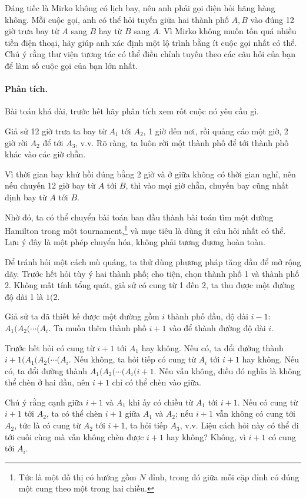 \documentclass[11pt]{article}
\begin{document}
Đáng tiếc là Mirko không có lịch bay, nên anh phải gọi điện hỏi hãng hàng
không. Mỗi cuộc gọi, anh có thể hỏi tuyến giữa hai thành phố $A,B$ vào đúng
12 giờ trưa bay từ $A$ sang $B$ hay từ $B$ sang $A$. Vì Mirko không muốn tốn
quá nhiều tiền điện thoại, hãy giúp anh xác định một lộ trình bằng ít cuộc gọi
nhất có thể. Chú ý rằng thư viện tương tác có thể điều chỉnh tuyến theo các
câu hỏi của bạn để làm số cuộc gọi của bạn lớn nhất.

\paragraph{Phân tích.}
Bài toán khá dài, trước hết hãy phân tích xem rốt cuộc nó yêu cầu gì.

Giả sử 12 giờ trưa ta bay từ $A_1$ tới $A_2$, 1 giờ đến nơi, rồi quảng cáo một
giờ, 2 giờ rời $A_2$ để tới $A_3$, v.v. Rõ ràng, ta luôn rời một thành phố để
tới thành phố khác vào các giờ chẵn.

Vì thời gian bay khứ hồi đúng bằng 2 giờ và ở giữa không có thời gian nghỉ,
nên nếu chuyến 12 giờ bay từ $A$ tới $B$, thì vào mọi giờ chẵn, chuyến bay
cũng nhất định bay từ $A$ tới $B$.

Nhờ đó, ta có thể chuyển bài toán ban đầu thành bài toán tìm một đường
Hamilton trong một tournament,\footnote{Tức là một đồ thị có hướng gồm $N$
đỉnh, trong đó giữa mỗi cặp đỉnh có đúng một cung theo một trong hai chiều.}
và mục tiêu là dùng ít câu hỏi nhất có thể. Lưu ý đây là một phép chuyển hóa,
không phải tương đương hoàn toàn.

Để tránh hỏi một cách mù quáng, ta thử dùng phương pháp tăng dần để mở rộng
dãy. Trước hết hỏi tùy ý hai thành phố; cho tiện, chọn thành phố 1 và thành
phố 2. Không mất tính tổng quát, giả sử có cung từ 1 đến 2, ta thu được một
đường độ dài 1 là $1(2$.

Giả sử ta đã thiết kế được một đường gồm $i$ thành phố đầu, độ dài $i-1$:
$A_1(A_2(\cdots(A_i$. Ta muốn thêm thành phố $i+1$ vào để thành đường độ dài
$i$.

Trước hết hỏi có cung từ $i+1$ tới $A_1$ hay không. Nếu có, ta đổi đường thành
$i+1(A_1(A_2(\cdots(A_i$. Nếu không, ta hỏi tiếp có cung từ $A_i$ tới $i+1$
hay không. Nếu có, ta đổi đường thành $A_1(A_2(\cdots(A_i(i+1$. Nếu vẫn
không, điều đó nghĩa là không thể chèn ở hai đầu, nên $i+1$ chỉ có thể chèn
vào giữa.

Chú ý rằng cạnh giữa $i+1$ và $A_1$ khi ấy có chiều từ $A_1$ tới $i+1$. Nếu có
cung từ $i+1$ tới $A_2$, ta có thể chèn $i+1$ giữa $A_1$ và $A_2$; nếu $i+1$
vẫn không có cung tới $A_2$, tức là có cung từ $A_2$ tới $i+1$, ta hỏi tiếp
$A_3$, v.v. Liệu cách hỏi này có thể đi tới cuối cùng mà vẫn không chèn được
$i+1$ hay không? Không, vì $i+1$ có cung tới $A_i$.
\end{document}
